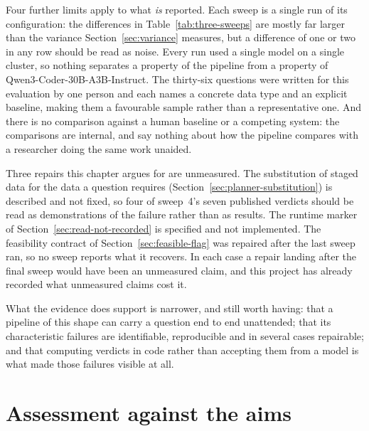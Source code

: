 Four further limits apply to what \emph{is} reported. Each sweep is a single run
of its configuration: the differences in Table~\ref{tab:three-sweeps} are mostly
far larger than the variance Section~\ref{sec:variance} measures, but a difference
of one or two in any row should be read as noise. Every run used a single model on
a single cluster, so nothing separates a property of the pipeline from a property
of Qwen3-Coder-30B-A3B-Instruct. The thirty-six questions were written for this
evaluation by one person and each names a concrete data type and an explicit
baseline, making them a favourable sample rather than a representative one. And
there is no comparison against a human baseline or a competing system: the
comparisons are internal, and say nothing about how the pipeline compares with a
researcher doing the same work unaided.

Three repairs this chapter argues for are unmeasured. The substitution of staged
data for the data a question requires (Section~\ref{sec:planner-substitution}) is
described and not fixed, so four of sweep~4's seven published verdicts should be
read as demonstrations of the failure rather than as results. The runtime marker
of Section~\ref{sec:read-not-recorded} is specified and not implemented. The
feasibility contract of Section~\ref{sec:feasible-flag} was repaired after the
last sweep ran, so no sweep reports what it recovers. In each case a repair
landing after the final sweep would have been an unmeasured claim, and this
project has already recorded what unmeasured claims cost it.

What the evidence does support is narrower, and still worth having: that a
pipeline of this shape can carry a question end to end unattended; that its
characteristic failures are identifiable, reproducible and in several cases
repairable; and that computing verdicts in code rather than accepting them from a
model is what made those failures visible at all.

\section{Assessment against the aims}
\label{sec:assessment}

